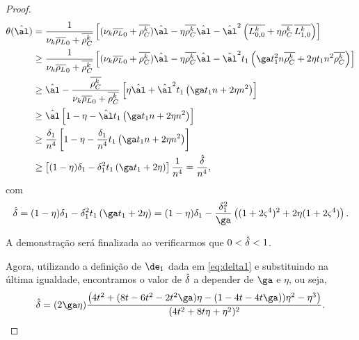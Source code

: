 \begin{proof}
\[
	\begin{aligned}
		\theta(\nextal)%
						& = \dfrac{1}{\nuk \dbvec{\rho_L}_0 + \rhoCkb }\left[ (\nuk \dbvec{\rho_L}_0 + \rhoCkb )\nextal -  \eta\rhoCkb \nextal - \nextal^{2}\left(\dbvec{L_{0,0}^{k}} + \eta\rhoCkb \, \dbvec{L_{1,0}^{k}} \right) \right] \\
						& \geq \dfrac{1}{\nuk \dbvec{\rho_L}_0 + \rhoCkb }\left[ (\nuk \dbvec{\rho_L}_0 + \rhoCkb )\nextal -  \eta\rhoCkb \nextal - \nextal^{2}t_{1}\left(\ga t_{1}^{2} n\rhoCkb  + 2\eta t_1 n^{2}\rhoCkb  \right) \right]\\
						& \geq \nextal - \dfrac{\rhoCkb }{\nuk \dbvec{\rho_L}_0 + \rhoCkb } \left[   \eta\nextal + \nextal^{2} t_{1}\left(\ga t_1 n + 2\eta  n^{2}  \right) \right]\\
						& \geq \nextal \left[ 1 -  \eta - \nextal t_{1}\left(\ga t_1 n + 2\eta  n^{2}  \right) \right] \\
						& \geq \frac{\delta_{1}}{n^{4}} \left[ 1 -  \eta - \frac{\delta_{1}}{n^{4}}t_{1}\left(\ga t_1 n + 2\eta  n^{2}  \right) \right] \\
						& \geq 	 \left[ (1 -  \eta)\delta_{1} - \delta_{1}^{2}t_{1}\left(\ga t_1  + 2\eta    \right) \right] \frac{1}{n^{4}}	
						 = \frac{\nextdel}{n^{4}},		
		\end{aligned}
	\]
	com 	\begin{equation}
		\label{eq:nextdelta}
		\nextdel = 
	(1 -  \eta)\delta_{1} - \delta_{1}^{2}t_{1}\left(\ga t_{1}  + 2\eta    \right) = (1 -  \eta)\delta_{1} - \dfrac{\delta_{1}^{2}}{\ga}\left((1+2\bdxzstar^{4})^{2}  + 2\eta(1+2\bdxzstar^{4})    \right).
	\end{equation} 
	
	 A demonstração será finalizada ao verificarmos que $0<\hat{\delta}<1$.

Agora, utilizando a definição de $\de_1$ dada em \eqref{eq:delta1} e substituindo na última igualdade, encontramos o valor de $\hat{\delta}$ a depender de $\ga$ e $\eta$,  ou seja, 
	\begin{equation}
		\label{eq:nextdel-full}
		\nextdel = (2\ga\eta)\frac{\left(4 t^2 +(8t - 6t^2   -2t^2\ga) \eta - ( 1 - 4t    - 4t   \ga) ) \eta^2 - \eta^3\right)}{(4t^2 + 8t\eta + \eta^{2})^{2}}.
	\end{equation}


\end{proof}
